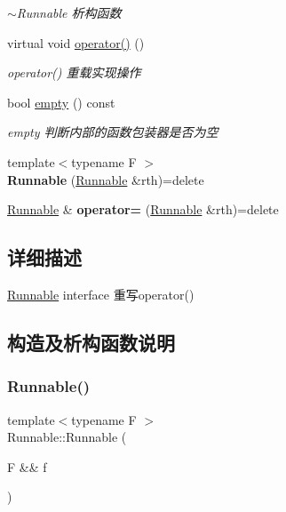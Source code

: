 \begin{DoxyCompactItemize}
\begin{DoxyCompactList}\small\item\em $\sim$\+Runnable 析构函数 \end{DoxyCompactList}\item 
\mbox{\label{classRunnable_a38bf849dab4bbb86fc5bc6e7aff383e0}} 
virtual void \hyperlink{classRunnable_a38bf849dab4bbb86fc5bc6e7aff383e0}{operator()} ()
\begin{DoxyCompactList}\small\item\em operator() 重载实现操作 \end{DoxyCompactList}\item 
bool \hyperlink{classRunnable_a3abba14a5cf19709cef2d299ee68acae}{empty} () const
\begin{DoxyCompactList}\small\item\em empty 判断内部的函数包装器是否为空 \end{DoxyCompactList}\item 
\mbox{\label{classRunnable_ae4f6e15a7503492b910f53ca8daf1795}} 
{\footnotesize template$<$typename F $>$ }\\{\bfseries Runnable} (\hyperlink{classRunnable}{Runnable} \&rth)=delete
\item 
\mbox{\label{classRunnable_a387d41d3a0c6d93e4aa4a72992531b52}} 
\hyperlink{classRunnable}{Runnable} \& {\bfseries operator=} (\hyperlink{classRunnable}{Runnable} \&rth)=delete
\end{DoxyCompactItemize}


\subsection{详细描述}
\hyperlink{classRunnable}{Runnable} interface 重写operator() 

\subsection{构造及析构函数说明}
\mbox{\label{classRunnable_ab052afa8b53dd1e7c28e978962839446}} 
\subsubsection{\texorpdfstring{Runnable()}{Runnable()}\hspace{0.1cm}{\footnotesize\ttfamily [1/3]}}
{\footnotesize\ttfamily template$<$typename F $>$ \\
Runnable\+::\+Runnable (\begin{DoxyParamCaption}\item[{F \&\&}]{f }\end{DoxyParamCaption})\hspace{0.3cm}{\ttfamily [inline]}}



